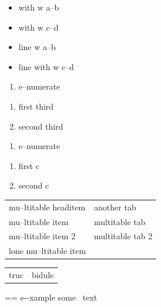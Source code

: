 \documentclass{book}
\makeatletter
\newenvironment{Texinfopreformatted}{%
  \par\GNUTobeylines\obeyspaces\frenchspacing\parskip=\z@\parindent=\z@}{}
{\catcode`\^^M=13 \gdef\GNUTobeylines{\catcode`\^^M=13 \def^^M{\null\par}}}
\newenvironment{Texinfoindented}{\begin{list}{}{}\item\relax}{\end{list}}
\renewcommand{\_}{\Texinfounderscore\discretionary{}{}{}}
\makeatother
\begin{document}
\begin{titlepage}
\begin{itemize}[label={}]
\item with w a--b
\item with w c--d
\end{itemize}

\begin{itemize}[label=\hbox{} on a line]
\item line w a--b
\item line with w c--d
\end{itemize}

\begin{enumerate}[start=1]
\item e--numerate
\end{enumerate}

\begin{enumerate}[start=3]
\item first third
\item second third
\end{enumerate}

\begin{enumerate}[label=\alph*.]
\item e--numerate
\end{enumerate}

\begin{enumerate}[label=\alph*.,start=3]
\item first c
\item second c
\end{enumerate}

\begin{tabular}{m{} m{}}%
mu--ltitable headitem &another tab\\
mu--ltitable item &multitable tab\\
mu--ltitable item 2 &multitable tab 2
\index[cp]{index entry within multitable@index entry within multitable}%
\\
lone mu--ltitable item&\\
\end{tabular}%

\begin{tabular}{m{} m{}}%
truc &bidule\\
\end{tabular}%

\begin{Texinfoindented}
\begin{Texinfopreformatted}%
\ttfamily e{-}{-}xample  some
\   text
\end{Texinfopreformatted}
\end{Texinfoindented}


\end{titlepage}
\end{document}
